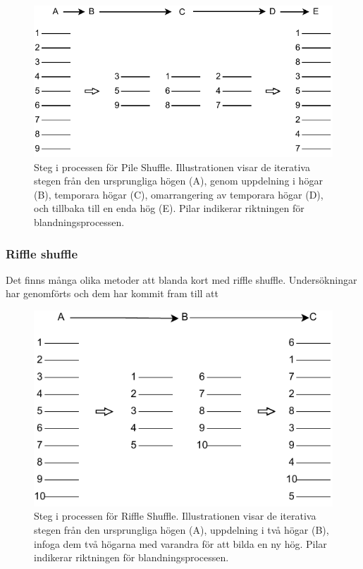 \documentclass[swedish,a4paper]{article}
\begin{document}
\begin{figure}[H]
	\begin{center}
		\includegraphics{images/pile_shuffle.pdf}
	\end{center}
	\captionsetup{justification=centering,margin=4cm}
	\caption{Steg i processen för Pile Shuffle. Illustrationen visar de
	iterativa stegen från den ursprungliga högen (A), genom uppdelning i
	högar (B), temporara högar (C), omarrangering av temporara högar (D),
	och tillbaka till en enda hög (E). Pilar indikerar riktningen för
	blandningsprocessen.
	}
	\label{fig:pile_shuffle_1}
\end{figure}

\subsubsection{Riffle shuffle}
Det finns många olika metoder att blanda kort med riffle shuffle. Undersökningar har genomförts och dem har kommit fram till att 

\begin{figure}[H]
	\begin{center}
		\includegraphics{images/rifflle-shuffle.pdf}
	\end{center}
	\captionsetup{justification=centering,margin=2cm}
	\caption{Steg i processen för Riffle Shuffle. Illustrationen visar de
	iterativa stegen från den ursprungliga högen (A), uppdelning i två
	högar (B), infoga dem två högarna med varandra för att bilda en ny hög.
        Pilar indikerar riktningen för blandningsprocessen.}
	\label{fig:riffle_shuffle_1}
\end{figure}
\end{document}
